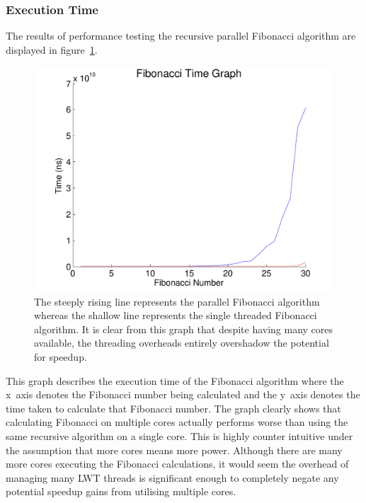 \documentclass[12pt,twoside,notitlepage]{report}
\begin{document}
\subsubsection{Execution Time}
The results of performance testing the recursive parallel Fibonacci algorithm are displayed in figure~\ref{fig:fib_time_graph}.
\begin{figure}[h!]
\includegraphics[width=\linewidth]{fib_time_graph}
\caption[Fibonacci Execution Time Graph]{The steeply rising line represents the parallel Fibonacci algorithm whereas the shallow line represents the single threaded Fibonacci algorithm. It is clear from this graph that despite having many cores available, the
threading overheads entirely overshadow the potential for speedup.}
\label{fig:fib_time_graph}
\end{figure}
This graph describes the execution time of the Fibonacci algorithm where the x~axis denotes the Fibonacci number being calculated and the y~axis denotes the time taken to calculate that Fibonacci number. The graph clearly shows that
calculating Fibonacci on multiple cores actually performs worse than using the same recursive algorithm on a single core. This is highly counter intuitive under the assumption that more cores means more power. Although there are many
more cores executing the Fibonacci calculations, it would seem the overhead of managing many LWT threads is significant enough to completely negate any potential speedup gains from utilising multiple cores.
\end{document}

